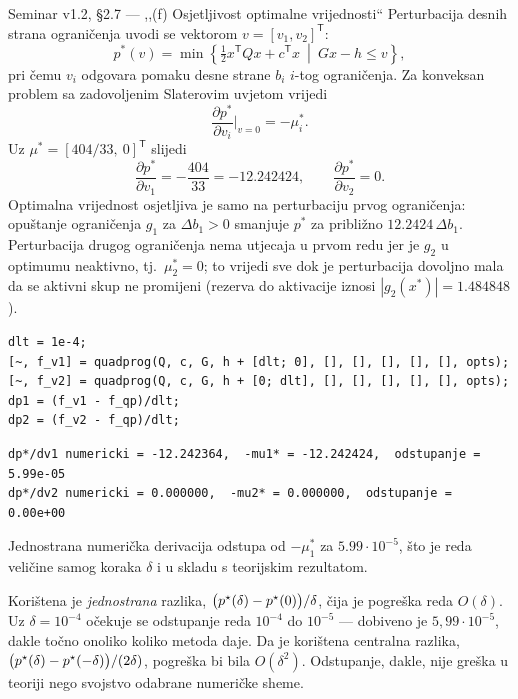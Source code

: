 \begin{seminar}{Seminar v1.2, §2.7 --- ,,(f) Osjetljivost optimalne vrijednosti``}
Perturbacija desnih strana ograničenja uvodi se vektorom $v = [v_1, v_2]^{\mathsf{T}}$:
\[
p^*(v) = \min \left\{ \tfrac{1}{2} x^{\mathsf{T}} Q x + c^{\mathsf{T}} x \ \middle| \ Gx - h \leq v \right\},
\]
pri čemu $v_i$ odgovara pomaku desne strane $b_i$ $i$-tog ograničenja. Za
konveksan problem sa zadovoljenim Slaterovim uvjetom vrijedi
\[
\frac{\partial p^*}{\partial v_i}\bigg|_{v = 0} = -\mu_i^*.
\]
Uz $\mu^* = [404/33,\ 0]^{\mathsf{T}}$ slijedi
\[
\frac{\partial p^*}{\partial v_1} = -\frac{404}{33} = -12.242424, \qquad
\frac{\partial p^*}{\partial v_2} = 0.
\]
Optimalna vrijednost osjetljiva je samo na perturbaciju prvog ograničenja:
opuštanje ograničenja $g_1$ za $\Delta b_1 > 0$ smanjuje $p^*$ za približno
$12.2424 \, \Delta b_1$. Perturbacija drugog ograničenja nema utjecaja u prvom
redu jer je $g_2$ u optimumu neaktivno, tj.\ $\mu_2^* = 0$; to vrijedi sve dok je
perturbacija dovoljno mala da se aktivni skup ne promijeni (rezerva do aktivacije
iznosi $|g_2(x^*)| = 1.484848$).

\begin{lstlisting}[style=matlabstyle]
dlt = 1e-4;
[~, f_v1] = quadprog(Q, c, G, h + [dlt; 0], [], [], [], [], [], opts);
[~, f_v2] = quadprog(Q, c, G, h + [0; dlt], [], [], [], [], [], opts);
dp1 = (f_v1 - f_qp)/dlt;
dp2 = (f_v2 - f_qp)/dlt;
\end{lstlisting}

\begin{lstlisting}[style=outputstyle]
dp*/dv1 numericki = -12.242364,  -mu1* = -12.242424,  odstupanje = 5.99e-05
dp*/dv2 numericki = 0.000000,  -mu2* = 0.000000,  odstupanje = 0.00e+00
\end{lstlisting}

Jednostrana numerička derivacija odstupa od $-\mu_1^*$ za $5.99 \cdot 10^{-5}$,
što je reda veličine samog koraka $\delta$ i u skladu s teorijskim rezultatom.
\end{seminar}

\begin{korak}
Korištena je \emph{jednostrana} razlika, $\bigl(p^{\star}(\delta) - p^{\star}(0)\bigr)/\delta$,
čija je pogreška reda $O(\delta)$. Uz $\delta = 10^{-4}$ očekuje se odstupanje
reda $10^{-4}$ do $10^{-5}$ --- dobiveno je $5{,}99\cdot 10^{-5}$, dakle točno
onoliko koliko metoda daje. Da je korištena centralna razlika,
$\bigl(p^{\star}(\delta) - p^{\star}(-\delta)\bigr)/(2\delta)$, pogreška bi bila $O(\delta^2)$.
Odstupanje, dakle, nije greška u teoriji nego svojstvo odabrane numeričke sheme.
\end{korak}

